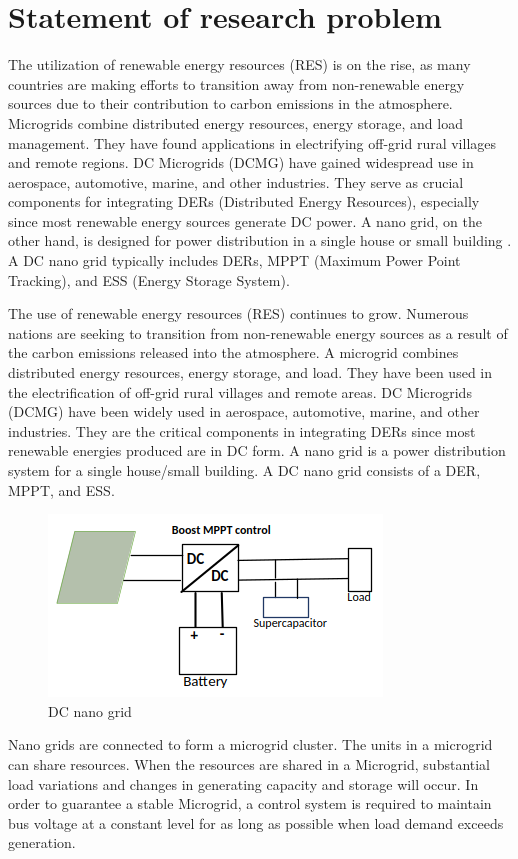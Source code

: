 \section{Statement of research problem}
The utilization of renewable energy resources (RES) is on the rise, as many countries are making efforts to transition away from non-renewable energy sources due to their contribution to carbon emissions in the atmosphere. Microgrids combine distributed energy resources, energy storage, and load management. They have found applications in electrifying off-grid rural villages and remote regions. DC Microgrids (DCMG) have gained widespread use in aerospace, automotive, marine, and other industries. They serve as crucial components for integrating DERs (Distributed Energy Resources), especially since most renewable energy sources generate DC power. A nano grid, on the other hand, is designed for power distribution in a single house or small building \cite{1}. A DC nano grid typically includes DERs, MPPT (Maximum Power Point Tracking), and ESS (Energy Storage System).\par
The use of renewable energy resources (RES) continues to grow. Numerous nations are seeking to transition from non-renewable energy sources as a result of the carbon emissions released into the atmosphere. A microgrid combines distributed energy resources, energy storage, and load. They have been used in the electrification of off-grid rural villages and remote areas. DC Microgrids (DCMG) have been widely used in aerospace, automotive, marine, and other industries. They are the critical components in integrating DERs since most renewable energies produced are in DC form. A nano grid is a power distribution system for a single house/small building. A DC nano grid consists of a DER, MPPT, and ESS.\par

\begin{figure}[H]
	\centering
	\includegraphics[totalheight=6cm]{Figures/dc nano grid.png}
	\caption{DC nano grid}
\end{figure}
Nano grids are connected to form a microgrid cluster. The units in a microgrid can share resources. When the resources are shared in a Microgrid, substantial load variations and changes in generating capacity and storage will occur. In order to guarantee a stable Microgrid, a control system is required to maintain bus voltage at a constant level for as long as possible when load demand exceeds generation.\\\relax

